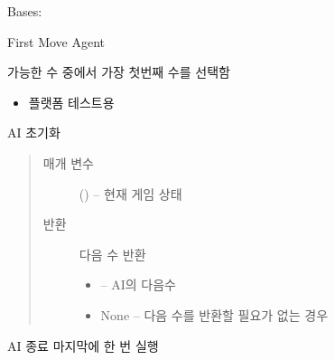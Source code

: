 \documentclass[letterpaper,10pt,english]{sphinxmanual}
\begin{document}
\begin{fulllineitems}
\label{\detokenize{agents.basic:agents.basic.debug_agent.FirstMoveAgent}}
Bases: {\hyperref[\detokenize{agents:agents.BaseAgent}]{}}

First Move Agent

가능한 수 중에서 가장 첫번째 수를 선택함
\begin{itemize}
\item {} 
플랫폼 테스트용

\end{itemize}

\begin{fulllineitems}
\label{\detokenize{agents.basic:agents.basic.debug_agent.FirstMoveAgent.act}}
AI 초기화
\begin{quote}\begin{description}
\item[{매개 변수}] \leavevmode
{} ({\hyperref[\detokenize{scripts:scripts.run_game.State}]{}}) -- 현재 게임 상태

\item[{반환}] \leavevmode

다음 수 반환
\begin{itemize}
\item {} 
 -- AI의 다음수

\item {} 
None -- 다음 수를 반환할 필요가 없는 경우

\end{itemize}


\end{description}\end{quote}

\end{fulllineitems}


\begin{fulllineitems}
\label{\detokenize{agents.basic:agents.basic.debug_agent.FirstMoveAgent.close}}
AI 종료
마지막에 한 번 실행


\end{fulllineitems}
\end{fulllineitems}
\end{document}
